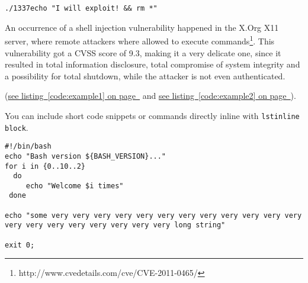 \documentclass[12pt,a4paper,titlepage,oneside]{scrartcl}
\begin{document}
\lstinline{./1337echo "I will exploit! && rm *"}

An occurrence of a shell injection vulnerability happened in the X.Org X11 server, where remote attackers where allowed to execute commands\footnote{http://www.cvedetails.com/cve/CVE-2011-0465/}. This vulnerability got a CVSS score of 9.3, making it a very delicate one, since it resulted in total information disclosure, total compromise of system integrity and a possibility for total shutdown, while the attacker is not even authenticated.

(\hyperref[code:example1]{see listing~\ref*{code:example1} on page~\pageref*{code:example1}} and \hyperref[code:example2]{see listing~\ref*{code:example2} on page~\pageref*{code:example2}}).

You can include short code snippets or commands directly inline with \lstinline{lstinline block}.

%

\begin{lstlisting}[caption=Example bash script,label=code:example2,style=simple]
#!/bin/bash
echo "Bash version ${BASH_VERSION}..."
for i in {0..10..2}
  do
     echo "Welcome $i times"
 done

echo "some very very very very very very very very very very very very very very very very very very very very long string"

exit 0;
\end{lstlisting}


%
%
\end{document}
